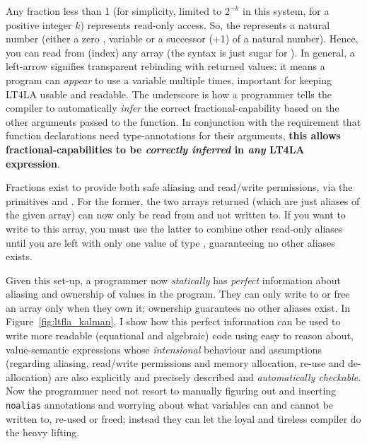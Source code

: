 Any fraction less than 1 (for simplicity, limited to $2^{-k}$ in this system,
for a positive integer $k$) represents read-only access. So, the 
represents a natural number (either a zero , variable  or a
successor (+1) of a natural number). Hence, you can read from (index) any array
 (the syntax  is just sugar for ). In general, a
left-arrow \highl{<-} signifies transparent rebinding with returned values: it
means a program can \emph{appear} to use a variable multiple times, important
for keeping LT4LA usable and readable. The underscore is how a programmer tells
the compiler to automatically \emph{infer} the correct fractional-capability
based on the other arguments passed to the function. In conjunction with the
requirement that function declarations need type-annotations for their
arguments, \textbf{this allows fractional-capabilities to be \emph{correctly
inferred} in \emph{any} LT4LA expression}.

Fractions exist to provide both safe aliasing and read/write permissions, via
the primitives  and
.  For the former,
the two arrays returned (which are just aliases of the given array) can now
only be read from and not written to. If you want to write to this array, you
must use the latter to combine other read-only aliases until you are left with
only one value of type , guaranteeing no other aliases exists.

Given this set-up, a programmer now \emph{statically} has \emph{perfect}
information about aliasing and ownership of values in the program. They can
only write to or free an array only when they own it; ownership guarantees no
other aliases exist. In Figure~\ref{fig:ltfla_kalman}, I show how this perfect
information can be used to write more readable (equational and algebraic) code
using easy to reason about, value-semantic expressions whose \emph{intensional}
behaviour and assumptions (regarding aliasing, read/write permissions and
memory allocation, re-use and de-allocation) are also explicitly and precisely
described and \emph{automatically checkable}. Now the programmer need not
resort to manually figuring out and inserting \texttt{noalias} annotations and
worrying about what variables can and cannot be written to, re-used or freed;
instead they can let the loyal and tireless compiler do the heavy lifting.

